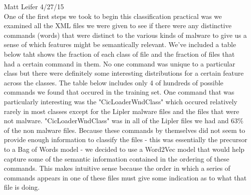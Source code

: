 \documentclass{article}
\begin{document}
	
\noindent Matt Leifer \hspace{5.5in} 4/27/15\\

One of the first steps we took to begin this classification practical was we examined all the XML files we were given to see if there were any distinctive commands (words) that were distinct to the various kinds of malware to give us a sense of which features might be semantically relevant. We've included a table below taht shows the fraction of each class of file and the fraction of files that had a certain command in them.  No one command was unique to a particular class but there were definitely some interesting distributions for a certain feature across the classes. The table below includes only 4 of hundreds of possible commands we found that occured in the training set.  One command that was particularly interesting was the "CicLoaderWndClass" which occured relatively rarely in most classes except for the Lipler malware files and the files that were not malware.  "CicLoaderWndClass" was in all of the Lipler files we had and 63\% of the non malware files.  Because these commands by themselves did not seem to provide enough information to classify the files - this was essentially the precursor to a Bag of Words model - we decided to use a Word2Vec model that would help capture some of the semantic information contained in the ordering of these commands.  This makes intuitive sense because the order in which a series of commands appears in one of these files must give some indication as to what that file is doing.   
\end{document}

